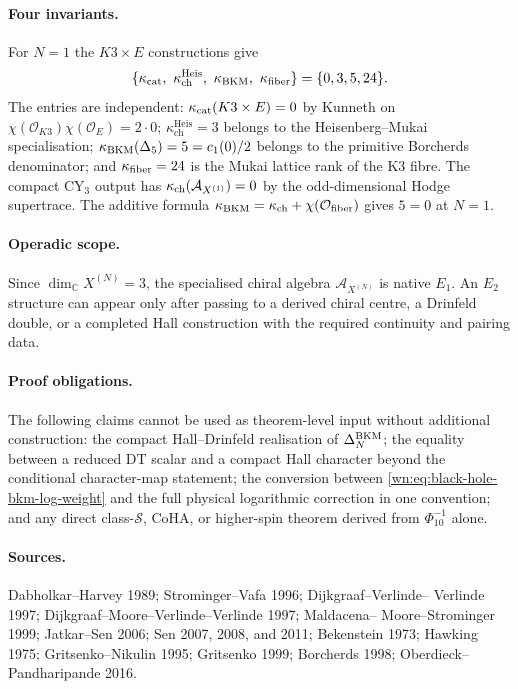 \paragraph{Four invariants.}
For $N=1$ the $K3\times E$ constructions give
\[
  \{\kcat,\ \kappa_{\mathrm{ch}}^{\mathrm{Heis}},\ \kBKM,\ \kfib\}
  =
  \{0,3,5,24\}.
\]
The entries are independent: $\kappa_{\mathrm{cat}}(K3\times E)=0$ by Kunneth on
$\chi(\mathcal O_{K3})\chi(\mathcal O_E)=2\cdot 0$;
$\kappa_{\mathrm{ch}}^{\mathrm{Heis}}=3$ belongs to the
Heisenberg--Mukai specialisation; $\kappa_{\mathrm{BKM}}(\Delta_5)=5=c_1(0)/2$ belongs
to the primitive Borcherds denominator; and $\kappa_{\mathrm{fiber}}=24$ is the Mukai
  lattice rank of the K3 fibre. The compact CY$_3$ output has
$\kappa_{\mathrm{ch}}(\mathcal A_{X^{(1)}})=0$ by the odd-dimensional Hodge
supertrace. The additive formula
$\kappa_{\mathrm{BKM}}=\kappa_{\mathrm{ch}}+\chi(\mathcal O_{\mathrm{fiber}})$ gives $5=0$ at $N=1$.

\paragraph{Operadic scope.}
Since $\dim_{\mathbb C}X^{(N)}=3$, the specialised chiral algebra
$\mathcal A_{X^{(N)}}$ is native $E_1$. An $E_2$ structure can appear
only after passing to a derived chiral centre, a Drinfeld double, or a
completed Hall construction with the required continuity and pairing
data.

\paragraph{Proof obligations.}
The following claims cannot be used as theorem-level input without
additional construction: the compact Hall--Drinfeld realisation of
$\Delta^{\mathrm{BKM}}_N$; the equality between a reduced DT scalar and a compact Hall
character beyond the conditional character-map statement; the
conversion between \eqref{wn:eq:black-hole-bkm-log-weight} and the full
physical logarithmic correction in one convention; and any direct
class-$\mathcal S$, CoHA, or higher-spin theorem derived from
$\Phi_{10}^{-1}$ alone.

\paragraph{Sources.}
Dabholkar--Harvey 1989; Strominger--Vafa 1996; Dijkgraaf--Verlinde--
Verlinde 1997; Dijkgraaf--Moore--Verlinde--Verlinde 1997; Maldacena--
Moore--Strominger 1999; Jatkar--Sen 2006; Sen 2007, 2008, and 2011;
Bekenstein 1973; Hawking 1975; Gritsenko--Nikulin 1995; Gritsenko
1999; Borcherds 1998; Oberdieck--Pandharipande 2016.
